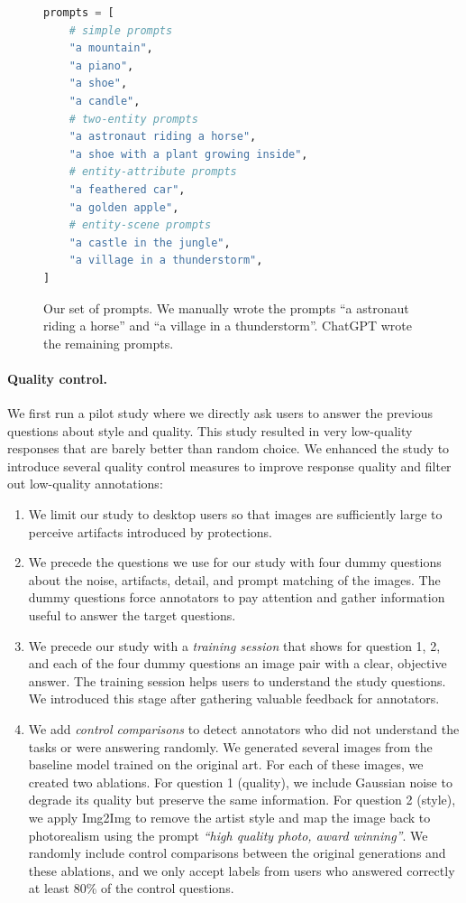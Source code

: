 \documentclass{article}
\begin{document}
\begin{figure}[]
\centering
\begin{lstlisting}[language=Python]
prompts = [
    # simple prompts
    "a mountain",
    "a piano",
    "a shoe",
    "a candle",
    # two-entity prompts
    "a astronaut riding a horse",
    "a shoe with a plant growing inside",
    # entity-attribute prompts
    "a feathered car",
    "a golden apple",
    # entity-scene prompts
    "a castle in the jungle",
    "a village in a thunderstorm",
]
\end{lstlisting}
\caption{Our set of prompts. We manually wrote the prompts ``a astronaut riding a horse'' and ``a village in a thunderstorm''. ChatGPT wrote the remaining prompts.}
\label{fig:prompts}
\end{figure}


\paragraph{Quality control.}

We first run a pilot study where we directly ask users to answer the previous questions about style and quality. This study resulted in very low-quality responses that are barely better than random choice. We enhanced the study to introduce several quality control measures to improve response quality and filter out low-quality annotations:
\begin{enumerate}
    \item We limit our study to desktop users so that images are sufficiently large to perceive artifacts introduced by protections.
    \item We precede the questions we use for our study with four dummy questions about
    the noise, artifacts, detail, and prompt matching of the images. The dummy questions force annotators to pay attention and gather information useful to answer the target questions.
    \item We precede our study with a \emph{training session} that shows for question 1, 2, and each of the four dummy questions an image pair with a clear, objective answer. The training session helps users to understand the study questions. We introduced this stage after gathering valuable feedback for annotators.
    \item We add \emph{control comparisons} to detect annotators who did not understand the tasks or were answering randomly. We generated several images from the baseline model trained on the original art. For each of these images, we created two ablations. For question 1 (quality), we include Gaussian noise to degrade its quality but preserve the same information. For question 2 (style), we apply Img2Img to remove the artist style and map the image back to photorealism using the prompt \textit{``high quality photo, award winning''}. We randomly include control comparisons between the original generations and these ablations, and we only accept labels from users who answered correctly at least 80\% of the control questions. 
\end{enumerate}
\end{document}
